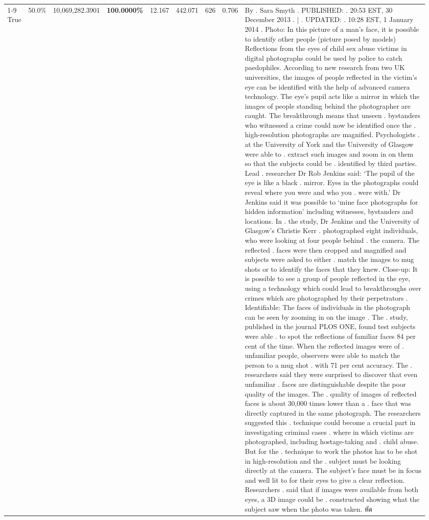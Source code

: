 \begin{table}[H]
\begin{tabular}{lllrlllll}
\cline{1-9}
True & 50.0\% & 10,069,282.3901 & \bfseries \color{red} 100.0000\% & 12.167 & 442.071 & 626 & 0.706 & By . Sara Smyth . PUBLISHED: . 20:53 EST, 30 December 2013 . | . UPDATED: . 10:28 EST, 1 January 2014 . Photo: In this picture of a man's face, it is possible to identify other people (picture posed by models) Reflections from the eyes of child sex abuse victims in digital photographs could be used by police to catch paedophiles. According to new research from two UK universities, the images of people reflected in the victim's eye can be identified with the help of advanced camera technology. The eye's pupil acts like a mirror in which the images of people standing behind the photographer are caught. The breakthrough means that unseen . bystanders who witnessed a crime could now be identified once the . high-resolution photographs are magnified. Psychologists . at the University of York and the University of Glasgow were able to . extract such images and zoom in on them so that the subjects could be . identified by third parties. Lead . researcher Dr Rob Jenkins said: ‘The pupil of the eye is like a black . mirror. Eyes in the photographs could reveal where you were and who you . were with.' Dr Jenkins said it was possible to ‘mine face photographs for hidden information' including witnesses, bystanders and locations. In . the study, Dr Jenkins and the University of Glasgow's Christie Kerr . photographed eight individuals, who were looking at four people behind . the camera. The reflected . faces were then cropped and magnified and subjects were asked to either . match the images to mug shots or to identify the faces that they knew. Close-up: It is possible to see a group of people reflected in the eye, using a technology which could lead to breakthroughs over crimes which are photographed by their perpetrators . Identifiable: The faces of individuals in the photograph can be seen by zooming in on the image . The . study, published in the journal PLOS ONE, found test subjects were able . to spot the reflections of familiar faces 84 per cent of the time. When the reflected images were of . unfamiliar people, observers were able to match the person to a mug shot . with 71 per cent accuracy. The . researchers said they were surprised to discover that even unfamiliar . faces are distinguishable despite the poor quality of the images. The . quality of images of reflected faces is about 30,000 times lower than a . face that was directly captured in the same photograph. The researchers suggested this . technique could become a crucial part in investigating criminal cases . where in which victims are photographed, including hostage-taking and . child abuse. But for the . technique to work the photos has to be shot in high-resolution and the . subject must be looking directly at the camera. The subject's face must be in focus and well lit to for their eyes to give a clear reflection. Researchers . said that if images were available from both eyes, a 3D image could be . constructed showing what the subject saw when the photo was taken. หัด \\

\end{tabular}
\end{table}
